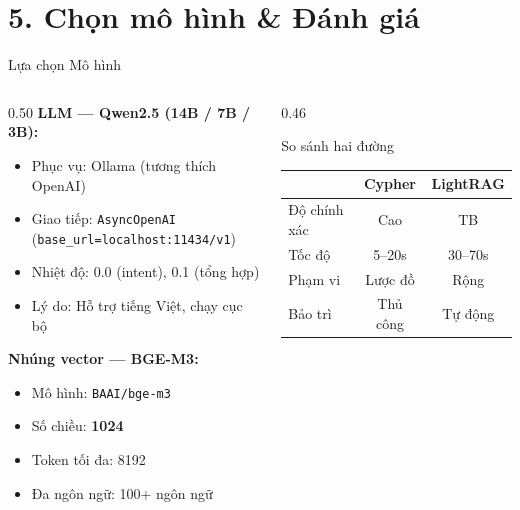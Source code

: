 \documentclass[aspectratio=169, 11pt]{beamer}
\begin{document}
\section{5. Chọn mô hình \& Đánh giá}

\begin{frame}{Lựa chọn Mô hình}
  \begin{columns}[t]
    \begin{column}{0.50\textwidth}
      \textbf{LLM --- Qwen2.5 (14B / 7B / 3B):}
      \begin{itemize}
        \scriptsize
        \item Phục vụ: Ollama (tương thích OpenAI)
        \item Giao tiếp: \texttt{AsyncOpenAI}\\
          (\texttt{base\_url=localhost:11434/v1})
        \item Nhiệt độ: 0.0 (intent), 0.1 (tổng hợp)
        \item Lý do: Hỗ trợ tiếng Việt, chạy cục bộ
      \end{itemize}
      \vspace{0.5em}
      \textbf{Nhúng vector --- BGE-M3:}
      \begin{itemize}
        \scriptsize
        \item Mô hình: \texttt{BAAI/bge-m3}
        \item Số chiều: \textbf{1024}
        \item Token tối đa: 8192
        \item Đa ngôn ngữ: 100+ ngôn ngữ
      \end{itemize}
    \end{column}
    \begin{column}{0.46\textwidth}
      \begin{block}{So sánh hai đường}
        \scriptsize
        \begin{tabular}{lcc}
          \toprule
          & \textbf{Cypher} & \textbf{LightRAG}\\
          \midrule
          Độ chính xác & \textcolor{successGreen}{Cao}     & \textcolor{warnOrange}{TB} \\
          Tốc độ       & \textcolor{successGreen}{5--20s}  & \textcolor{warnOrange}{30--70s} \\
          Phạm vi      & \textcolor{warnOrange}{Lược đồ}  & \textcolor{successGreen}{Rộng} \\
          Bảo trì      & \textcolor{warnOrange}{Thủ công} & \textcolor{successGreen}{Tự động} \\
          \bottomrule
        \end{tabular}
      \end{block}
    \end{column}
  \end{columns}
\end{frame}
\end{document}
